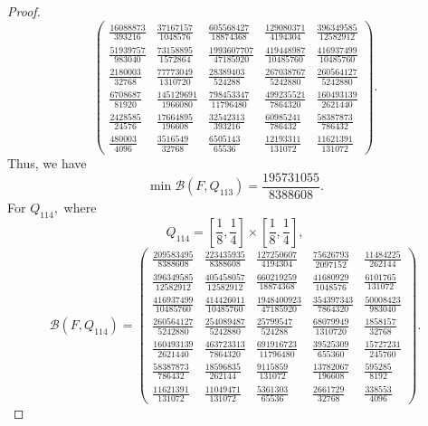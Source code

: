 \documentclass[10pt,a4paper]{amsart}
\begin{document}
\begin{proof}
\[\begin{pmatrix}
	\frac{16088873}{393216} & \frac{37167157}{1048576} & \frac{605568427}{18874368} & \frac{129080371}{4194304} & \frac{396349585}{12582912}\\[5mm]
	\frac{51939757}{983040} & \frac{73158895}{1572864} & \frac{1993607707}{47185920} & \frac{419448987}{10485760} & \frac{416937499}{10485760}\\[5mm]
	\frac{2180003}{32768} & \frac{77773049}{1310720} & \frac{28389403}{524288} & \frac{267038767}{5242880} & \frac{260564127}{5242880}\\[5mm]
	\frac{6708687}{81920} & \frac{145129691}{1966080} & \frac{798453347}{11796480} & \frac{499235521}{7864320} & \frac{160493139}{2621440}\\[5mm]
	\frac{2428585}{24576} & \frac{17664895}{196608} & \frac{32542313}{393216} & \frac{60985241}{786432} & \frac{58387873}{786432}\\[5mm]
	\frac{480003}{4096} & \frac{3516549}{32768} & \frac{6505143}{65536} & \frac{12193311}{131072} & \frac{11621391}{131072}
\end{pmatrix}.
\]
Thus, we have
\[
\min \mathcal B(F,Q_{113})=\frac{195731055}{8388608}.
\]
For $Q_{114},$ where
\[
Q_{114}=\left[\frac18,\frac14\right]\times\left[\frac18,\frac14\right],
\]
\[
\mathcal B(F,Q_{114})=
\begin{pmatrix}
	\frac{209583495}{8388608} & \frac{223435935}{8388608} & \frac{127250607}{4194304} & \frac{75626793}{2097152} & \frac{11484225}{262144}\\[5mm]
	\frac{396349585}{12582912} & \frac{405458057}{12582912} & \frac{660219259}{18874368} & \frac{41680929}{1048576} & \frac{6101765}{131072}\\[5mm]
	\frac{416937499}{10485760} & \frac{414426011}{10485760} & \frac{1948400923}{47185920} & \frac{354397343}{7864320} & \frac{50008423}{983040}\\[5mm]
	\frac{260564127}{5242880} & \frac{254089487}{5242880} & \frac{25799547}{524288} & \frac{68079949}{1310720} & \frac{1858157}{32768}\\[5mm]
	\frac{160493139}{2621440} & \frac{463723313}{7864320} & \frac{691916723}{11796480} & \frac{39525309}{655360} & \frac{15727231}{245760}\\[5mm]
	\frac{58387873}{786432} & \frac{18596835}{262144} & \frac{9115859}{131072} & \frac{13782067}{196608} & \frac{595285}{8192}\\[5mm]
	\frac{11621391}{131072} & \frac{11049471}{131072} & \frac{5361303}{65536} & \frac{2661729}{32768} & \frac{338553}{4096}
\end{pmatrix}.
\]
\end{proof}
\end{document}
